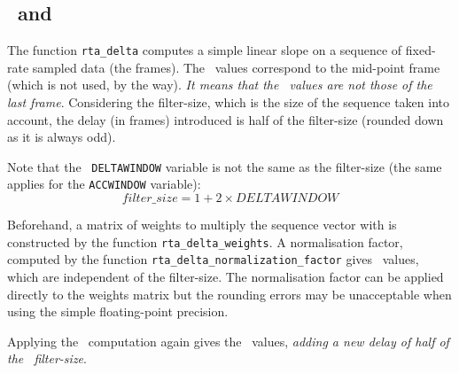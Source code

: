 \documentclass[a4paper, twoside]{article}
\begin{document}
\subsection{\Del\ and \ddel\  \mfcc}
\label{sec:delta_mfcc}

The function \texttt{rta\_delta} computes a simple linear slope on a
sequence of fixed-rate sampled data (the frames). The \del\ values
correspond to the mid-point frame (which is not used, by the
way). \emph{It means that the \del\ values are not those of the last
  frame}. Considering the filter-size, which is the size of the
sequence taken into account, the delay (in frames) introduced is half
of the filter-size (rounded down as it is always odd).

Note that the \htk\ \texttt{DELTAWINDOW} variable is not the same as
the filter-size (the same applies for the \texttt{ACCWINDOW}
variable):
$$ filter\_size = 1 + 2 \times DELTAWINDOW $$

Beforehand, a matrix of weights to multiply the sequence vector with
is constructed by the function \texttt{rta\_delta\_weights}. A
normalisation factor, computed by the function
\texttt{rta\_delta\_normalization\_factor} gives \del\ values, which
are independent of the filter-size. The normalisation factor can be
applied directly to the weights matrix but the rounding errors may be
unacceptable when using the simple floating-point precision.

Applying the \del\ computation again gives the \ddel\ values,
\emph{adding a new delay of half of the \ddel\ filter-size}.
\end{document}
